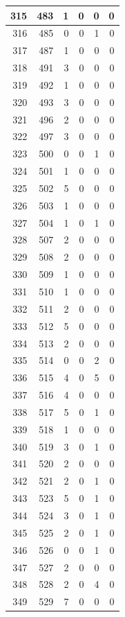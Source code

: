 \documentclass[
  letterpaper,
  DIV=11,
  numbers=noendperiod]{scrreprt}
\begin{document}
\begin{tabular}{r|r|r|r|r|r}
\hline
315 & 483 & 1 & 0 & 0 & 0\\
\hline
316 & 485 & 0 & 0 & 1 & 0\\
\hline
317 & 487 & 1 & 0 & 0 & 0\\
\hline
318 & 491 & 3 & 0 & 0 & 0\\
\hline
319 & 492 & 1 & 0 & 0 & 0\\
\hline
320 & 493 & 3 & 0 & 0 & 0\\
\hline
321 & 496 & 2 & 0 & 0 & 0\\
\hline
322 & 497 & 3 & 0 & 0 & 0\\
\hline
323 & 500 & 0 & 0 & 1 & 0\\
\hline
324 & 501 & 1 & 0 & 0 & 0\\
\hline
325 & 502 & 5 & 0 & 0 & 0\\
\hline
326 & 503 & 1 & 0 & 0 & 0\\
\hline
327 & 504 & 1 & 0 & 1 & 0\\
\hline
328 & 507 & 2 & 0 & 0 & 0\\
\hline
329 & 508 & 2 & 0 & 0 & 0\\
\hline
330 & 509 & 1 & 0 & 0 & 0\\
\hline
331 & 510 & 1 & 0 & 0 & 0\\
\hline
332 & 511 & 2 & 0 & 0 & 0\\
\hline
333 & 512 & 5 & 0 & 0 & 0\\
\hline
334 & 513 & 2 & 0 & 0 & 0\\
\hline
335 & 514 & 0 & 0 & 2 & 0\\
\hline
336 & 515 & 4 & 0 & 5 & 0\\
\hline
337 & 516 & 4 & 0 & 0 & 0\\
\hline
338 & 517 & 5 & 0 & 1 & 0\\
\hline
339 & 518 & 1 & 0 & 0 & 0\\
\hline
340 & 519 & 3 & 0 & 1 & 0\\
\hline
341 & 520 & 2 & 0 & 0 & 0\\
\hline
342 & 521 & 2 & 0 & 1 & 0\\
\hline
343 & 523 & 5 & 0 & 1 & 0\\
\hline
344 & 524 & 3 & 0 & 1 & 0\\
\hline
345 & 525 & 2 & 0 & 1 & 0\\
\hline
346 & 526 & 0 & 0 & 1 & 0\\
\hline
347 & 527 & 2 & 0 & 0 & 0\\
\hline
348 & 528 & 2 & 0 & 4 & 0\\
\hline
349 & 529 & 7 & 0 & 0 & 0\\

\end{tabular}
\end{document}
